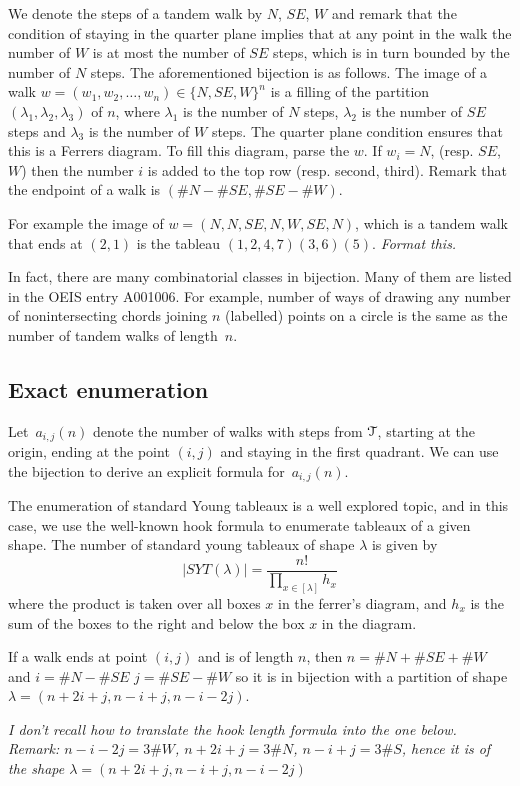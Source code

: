 \documentclass[11pt]{article}
\newcommand\mjm[1]{\mbox{}
{\marginpar{\color{red!50}$\EuScript{M}$}}
{\it\noindent\color{red!50}#1}}%
\newcommand{\cT}{\EuScript{T}}
\begin{document}
We denote the steps of a tandem walk by $N$, $SE$, $W$ and remark that
the condition of staying in the quarter plane implies that at any
point in the walk the number of $W$ is at most the number of $SE$
steps, which is in turn bounded by the number of $N$ steps.  The
aforementioned bijection is as follows. The image of a walk
$w=(w_1, w_2, \dots, w_n)\in \{N, SE, W\}^n$ is a filling of the
partition $(\lambda_1, \lambda_2, \lambda_3)$ of $n$, where
$\lambda_1$ is the number of $N$ steps, $\lambda_2$ is the number of
$SE$ steps and $\lambda_3$ is the number of $W$ steps. The quarter
plane condition ensures that this is a Ferrers diagram. To fill this
diagram, parse the $w$. If $w_i=N$, (resp. $SE$, $W$) then the number
$i$ is added to the top row (resp. second, third).  Remark that the
endpoint of a walk is $(\#N-\#SE, \#SE -\#W)$.

For example the image of $w=(N, N, SE, N, W, SE, N)$, which is a
tandem walk that ends at $(2, 1)$ is the tableau
$(1,2,4,7)(3,6)(5)$. \mjm{Format this.}

In fact, there are many combinatorial classes in bijection. Many of
them are listed in the OEIS entry A001006. For example, number of ways
of drawing any number of nonintersecting chords joining $n$ (labelled)
points on a circle is the same as the number of tandem walks of length~$n$. 

\subsection{Exact enumeration}
Let~$a_{i,j}(n)$ denote the number of walks with steps from $\cT$,
starting at the origin, ending at the point $(i,j)$ and staying in the
first quadrant. We can use the bijection to derive an explicit formula
for~$a_{i,j}(n)$. 

The enumeration of standard Young tableaux is a well explored topic,
and in this case, we use the well-known hook formula to enumerate
tableaux of a given shape. The number of standard young tableaux of
shape $\lambda$ is given by
\[|SYT(\lambda)| = \frac{n!}{\prod_{x\in[\lambda]} h_x}\]
where the product is taken over all boxes $x$ in the ferrer's diagram,
and $h_x$ is the sum of the boxes to the right and below the box $x$
in the diagram.

If a walk ends at point $(i,j)$ and is of length $n$, then $n=\#N
+\#SE+\#W$ and $i=\#N-\#SE$ $j=\#SE -\#W$ so it is in bijection 
with a partition of shape $\lambda=(n+2i+j, n-i+j, n-i-2j)$.

\mjm{I don't recall how to translate the hook length formula into the one below.
Remark: $n-i-2j=3 \#W$, $n+2i+j=3\#N$, $n-i+j=3\#S$, hence it is 
of the shape $\lambda=(n+2i+j, n-i+j, n-i-2j)$}
\end{document}
